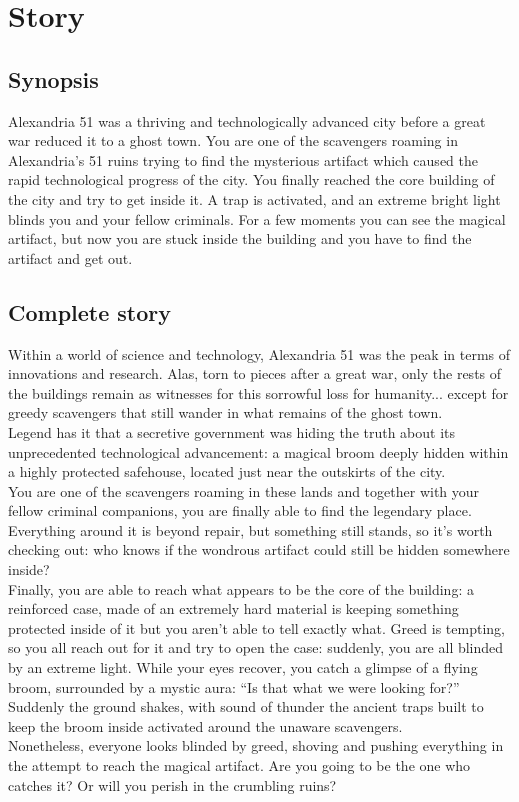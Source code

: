 \section{Story}

\subsection{Synopsis}

Alexandria 51 was a thriving and technologically advanced city before a great war reduced it to a ghost town. You are one of the scavengers roaming in Alexandria’s 51 ruins trying to find the mysterious artifact which caused the rapid technological progress of the city. You finally reached the core building of the city and try to get inside it. A trap is activated, and an extreme bright light blinds you and your fellow criminals. For a few moments you can see the magical artifact, but now you are stuck inside the building and you have to find the artifact and get out.


\subsection{Complete story}

Within a world of science and technology, Alexandria 51 was the peak in terms of innovations and research. Alas, torn to pieces after a great war, only the rests of the buildings remain as witnesses for this sorrowful loss for humanity... except for greedy scavengers that still wander in what remains of the ghost town.\\
Legend has it that a secretive government was hiding the truth about its unprecedented technological advancement: a magical broom deeply hidden within a highly protected safehouse, located just near the outskirts of the city.\\
You are one of the scavengers roaming in these lands and together with your fellow criminal companions, you are finally able to find the legendary place. Everything around it is beyond repair, but something still stands, so it’s worth checking out: who knows if the wondrous artifact could still be hidden somewhere inside?\\
Finally, you are able to reach what appears to be the core of the building: a reinforced case, made of an extremely hard material is keeping something protected inside of it but you aren’t able to tell exactly what. Greed is tempting, so you all reach out for it and try to open the case: suddenly, you are all blinded by an extreme light. While your eyes recover, you catch a glimpse of a flying broom, surrounded by a mystic aura: “Is that what we were looking for?”\\
Suddenly the ground shakes, with sound of thunder the ancient traps built to keep the broom inside activated around the unaware scavengers.\\
Nonetheless, everyone looks blinded by greed, shoving and pushing everything in the attempt to reach the magical artifact. Are you going to be the one who catches it? Or will you perish in the crumbling ruins?\\


